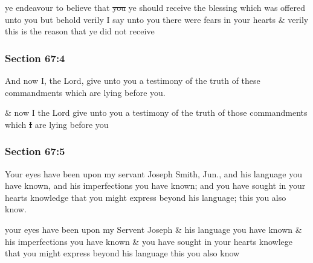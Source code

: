 		\begin{framed}
		\scriptsize
			\begin{compactdesc}
				\item[JSP] ye endeavour to believe that \sout{you} ye should receive the blessing which was offered unto you but behold verily I say unto you there were fears in your hearts \& verily this is the reason that ye did not receive
			\end{compactdesc}
		\end{framed}

	\subsubsection{Section 67:4} %
		\label{DC67-4}

		And now I, the Lord, give unto you a testimony of the truth of these commandments which are lying before you.

		\begin{framed}
		\scriptsize
			\begin{compactdesc}
				\item[JSP] \& now I the Lord give unto you a testimony of the truth of those commandments which \sout{I} are lying before you
			\end{compactdesc}
		\end{framed}

	\subsubsection{Section 67:5} %
		\label{DC67-5}

		Your eyes have been upon my servant Joseph Smith, Jun., and his language you have known, and his imperfections you have known; and you have sought in your hearts knowledge that you might express beyond his language; this you also know.

		\begin{framed}
		\scriptsize
			\begin{compactdesc}
				\item[JSP] your eyes have been upon my Servent Joseph \& his language you have known \& his imperfections you have known \& you have sought in your hearts knowlege that you might express beyond his language this you also know
			\end{compactdesc}
		\end{framed}

